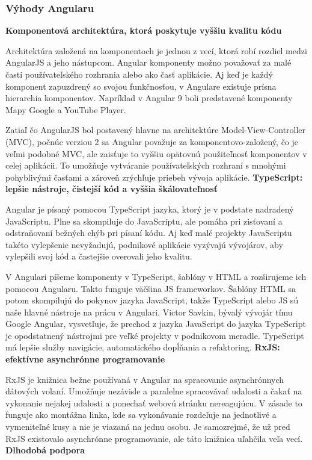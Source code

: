 \newpage

\subsubsection{Výhody Angularu}
\noindent\textbf{Komponentová architektúra, ktorá poskytuje vyššiu kvalitu kódu}

\indent  Architektúra založená na komponentoch je jednou z vecí, ktorá robí rozdiel medzi AngularJS a jeho nástupcom. Angular komponenty možno považovať za malé časti používateľského rozhrania alebo ako časť aplikácie. Aj keď je každý komponent zapuzdrený so svojou funkčnosťou, v Angulare existuje prísna hierarchia komponentov. Napríklad v Angular 9 boli predstavené komponenty Mapy Google a YouTube Player.

\indent Zatiaľ čo AngularJS bol postavený hlavne na architektúre Model-View-Controller (MVC), počnúc verziou 2 sa Angular považuje za komponentovo-založený, čo je veľmi podobné MVC, ale zaisťuje to vyššiu opätovnú použiteľnosť komponentov v celej aplikácii. To umožňuje vytváranie používateľských rozhraní s mnohými pohyblivými časťami a zároveň zrýchľuje priebeh vývoja aplikácie. \newline
\textbf{TypeScript: lepšie nástroje, čistejší kód a vyššia škálovateľnosť}

\indent Angular je písaný pomocou TypeScript jazyka, ktorý je v podstate nadradený JavaScriptu. Plne sa skompiluje do JavaScriptu, ale pomáha pri zisťovaní a odstraňovaní bežných chýb pri písaní kódu. Aj keď malé projekty JavaScriptu takéto vylepšenie nevyžadujú, podnikové aplikácie vyzývajú vývojárov, aby vylepšili svoj kód a častejšie overovali jeho kvalitu.

\indent V Angulari píšeme komponenty v TypeScript, šablóny v HTML a rozširujeme ich pomocou Angularu. Takto funguje väčšina JS frameworkov. Šablóny HTML sa potom skompilujú do pokynov jazyka JavaScript, takže TypeScript alebo JS sú naše hlavné nástroje na prácu v Angulari. Victor Savkin, bývalý vývojár tímu Google Angular, vysvetľuje, že prechod z jazyka JavaScript do jazyka TypeScript je opodstatnený nástrojmi pre veľké projekty v podnikovom meradle. TypeScript má lepšie služby navigácie, automatického dopĺňania a refaktoring.\newline
\textbf{RxJS: efektívne asynchrónne programovanie}

\indent RxJS je knižnica bežne používaná v Angular na spracovanie asynchrónnych dátových volaní. Umožňuje nezávisle a paralelne spracovávať udalosti a čakať na vykonanie nejakej udalosti a ponechať webovú stránku nereagujúcu. V zásade to funguje ako montážna linka, kde sa vykonávanie rozdeľuje na jednotlivé a vymeniteľné kusy a nie je viazaná na jednu osobu. Je samozrejmé, že už pred RxJS existovalo asynchrónne programovanie, ale táto knižnica uľahčila veľa vecí.\newline
\textbf{Dlhodobá podpora}

